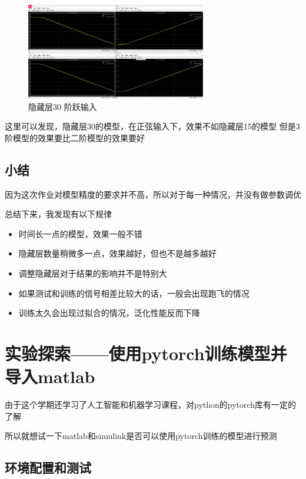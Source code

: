 \documentclass[12pt,a4paper,UTF8]{article}
\begin{document}
\begin{figure}[htbp] \centering \includegraphics[width=0.7\textwidth]{figures/2024-12-24-00-40-59.png} \caption{隐藏层30 阶跃输入} \label{  }\end{figure}

这里可以发现，隐藏层30的模型，在正弦输入下，效果不如隐藏层15的模型
但是3阶模型的效果要比二阶模型的效果要好

\subsection{小结}
因为这次作业对模型精度的要求并不高，所以对于每一种情况，并没有做参数调优

总结下来，我发现有以下规律



\begin{itemize}
    \item 时间长一点的模型，效果一般不错
    \item 隐藏层数量稍微多一点，效果越好，但也不是越多越好
    \item 调整隐藏层对于结果的影响并不是特别大
    \item 如果测试和训练的信号相差比较大的话，一般会出现跑飞的情况
    \item 训练太久会出现过拟合的情况，泛化性能反而下降
\end{itemize}

\clearpage
\section{实验探索——使用pytorch训练模型并导入matlab}

由于这个学期还学习了人工智能和机器学习课程，对python的pytorch库有一定的了解

所以就想试一下matlab和simulink是否可以使用pytorch训练的模型进行预测

\subsection{环境配置和测试}
\end{document}
